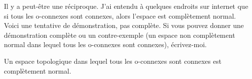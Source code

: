 \begin{probleme}
	Il y a peut-être une réciproque. J'ai entendu à quelques endroits sur internet que si tous les o-connexes sont connexes, alors l'espace est complètement normal. Voici une tentative de démonstration, pas complète. Si vous pouvez donner une démonstration complète ou un contre-exemple (un espace non complètement normal dans lequel tous les o-connexes sont connexes), écrivez-moi.
\end{probleme}

\begin{pseudotheorem}	\label{THOooMULNooNYeHAj}			%
	Un espace topologique dans lequel tous les o-connexes sont connexes est complètement normal.
\end{pseudotheorem}


